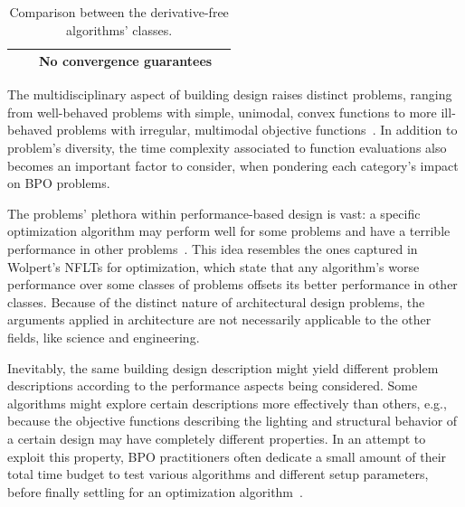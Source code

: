 \begin{table}[]
{\begin{tabular}{r|c|c|c|}
				\multicolumn{1}{|r|}{} &  & No convergence guarantees &  \\ \hline
			\end{tabular}%
		}
		\caption{Comparison between the derivative-free algorithms' classes.}
		\label{table:compare-dfo-algos}
	\end{table}
	
	
	The multidisciplinary aspect of building design raises distinct problems, ranging from well-behaved problems with simple, unimodal, convex functions to more ill-behaved problems with irregular, multimodal objective functions~\cite{Wortmann2017ADO}. In addition to problem's diversity, the time complexity associated to function evaluations also becomes an important factor to consider, when pondering each category's impact on \ac{BPO} problems.
	
	The problems' plethora within performance-based design is vast: a specific optimization algorithm may perform well for some problems and have a terrible performance in other problems~\cite{Wortmann2017GABESTCHOICE, Fang2017}. This idea resembles the ones captured in Wolpert's \acp{NFLT} for optimization, which state that any algorithm's worse performance over some classes of problems offsets its better performance in other classes. Because of the distinct nature of architectural design problems, the arguments applied in architecture are not necessarily applicable to the other fields, like science and engineering. 
	
	Inevitably, the same building design description might yield different problem descriptions according to the performance aspects being considered. Some algorithms might explore certain descriptions more effectively than others, e.g., because the objective functions describing the lighting and structural behavior of a certain design may have completely different properties. In an attempt to exploit this property, \ac{BPO} practitioners often dedicate a small amount of their total time budget to test various algorithms and different setup parameters, before finally settling for an optimization algorithm~\cite{Hamdy2016}.	
	
